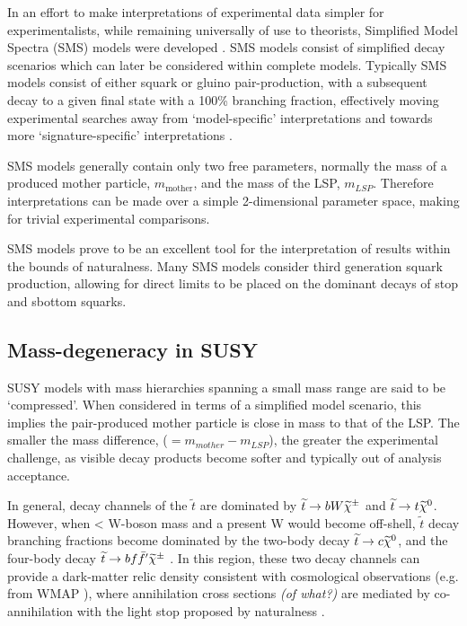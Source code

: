 In an effort to make interpretations of experimental data simpler for
experimentalists, while remaining universally of use to theorists,
Simplified Model Spectra (SMS) models were developed
\cite{PhysRevD.79.075020,Alves:2011wf}.
SMS models consist of simplified
decay scenarios which can later be considered within complete models.
Typically SMS models consist of either squark or gluino pair-production, with a
subsequent decay to a given final state with a 100\% branching fraction,
effectively moving
experimental searches away from `model-specific' interpretations and
towards more `signature-specific' interpretations \cite{PhysRevD.88.052017}.

SMS models generally contain only two free parameters, normally the mass of a
produced mother particle, $m_{\text{mother}}$, and the mass of the LSP,
$m_{LSP}$. Therefore interpretations can be made over a simple 2-dimensional
parameter space, making for trivial experimental comparisons.

SMS models prove to be an excellent tool for the interpretation of results
within the bounds of naturalness. Many SMS models consider third generation
squark production, allowing for direct limits to be placed on the dominant
decays of stop and sbottom squarks.

\subsection{Mass-degeneracy in SUSY}
SUSY models with mass hierarchies spanning a small mass range are said to be
`compressed'. When considered in terms of a simplified model scenario, this
implies the pair-produced mother particle is close in mass to that of the LSP.
The
smaller the mass difference, \deltam ($= m_{mother} - m_{LSP}$), the greater the
experimental challenge, as visible
decay products become softer and typically out of analysis acceptance.

In general, decay channels of the $\tilde{t}$ are dominated by $\widetilde{t}\rightarrow
bW\widetilde{\chi}^{\pm}$ and
$\widetilde{t}\rightarrow t\widetilde{\chi}^{0}$. However, when \deltam < W-boson
mass and a present W would become off-shell, $\tilde{t}$ decay branching
fractions
become
dominated by the two-body decay $\widetilde{t}\rightarrow c\widetilde{\chi}^{0}$, and the four-body decay
$\widetilde{t}\rightarrow bf\bar{f}'\widetilde{\chi}^{\pm}$ \cite{Boehm:1999tr}. In this region, these two decay
channels can provide a dark-matter relic density consistent with cosmological
observations (e.g. from WMAP \cite{Spergel:2003cb}), where annihilation cross
sections \emph{(of what?)}
are mediated by co-annihilation with the light stop proposed by naturalness
\cite{Balazs:2004bu,Martin:2007gf}.

